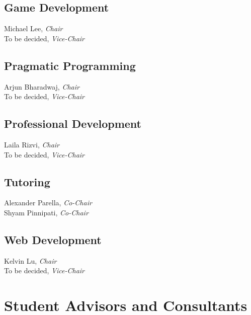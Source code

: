 \documentclass[10pt]{article}
\newcommand{\chair}[1]{#1, \textit{Chair}}
\newcommand{\vicechair}[1]{#1, \textit{Vice-Chair}}
\newcommand{\cochair}[1]{#1, \textit{Co-Chair}}
\begin{document}
\subsection{Game Development}

\chair{Michael Lee}\\
\vicechair{To be decided}

\subsection{Pragmatic Programming}

\chair{Arjun Bharadwaj}\\
\vicechair{To be decided}

\subsection{Professional Development}

\chair{Laila Rizvi}\\
\vicechair{To be decided}

\subsection{Tutoring}

\cochair{Alexander Parella}\\
\cochair{Shyam Pinnipati}


\subsection{Web Development}

\chair{Kelvin Lu}\\
\vicechair{To be decided}

\section{Student Advisors and Consultants}
\end{document}
